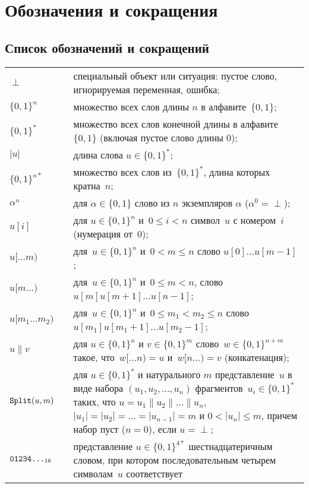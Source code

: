 \chapter{Обозначения и сокращения}\label{DEFS}

\section{Список обозначений и сокращений}

{\tabcolsep 0pt
\begin{longtable}{lrp{14.0cm}}
$\perp$  & \hspace{3mm} &
специальный объект или ситуация: 
пустое слово, игнорируемая переменная, ошибка;
\\[4pt]
%
$\{0,1\}^n$  &&
множество всех слов длины $n$ в алфавите~$\{0,1\}$;
\\[4pt]
%
$\{0,1\}^*$  &&
множество всех слов конечной длины в алфавите~$\{0,1\}$
(включая пустое слово длины $0$);
\\[4pt]
%
$|u|$      &&
длина слова $u\in\{0,1\}^*$;
\\[4pt]
%
$\{0,1\}^{n*}$  &&
множество всех слов из~$\{0,1\}^*$,
длина которых кратна~$n$;
\\[4pt]
%
$\alpha^n$  &&
для $\alpha\in\{0,1\}$ слово из $n$ экземпляров $\alpha$
($\alpha^0=\perp$);
\\[4pt]
%
$u[i]$ &&
для $u\in\{0,1\}^n$ и~$0\leq i<n$ символ~$u$ с номером~$i$
(нумерация от~$0$);
\\[4pt]
%
$u[\dots m)$ &&
для~$u\in\{0,1\}^n$ и~$0<m\leq n$ слово $u[0]\ldots u[m-1]$;
\\[4pt]
%
$u[m\dots)$  && 
для~$u\in\{0,1\}^n$ и~$0\leq m<n$, слово~$u[m]u[m+1]\ldots u[n-1]$;
\\[4pt]
%
$u[m_1\dots m_2)$  && 
для~$u\in\{0,1\}^n$ и~$0\leq m_1 <m_2\leq n$ слово
$u[m_1]u[m_1+1]\ldots u[m_2-1]$; 
\\[4pt]
%
$u\parallel v$  &&
для $u\in\{0,1\}^n$ и $v\in\{0,1\}^m$
слово~$w\in\{0,1\}^{n+m}$ такое, что~$w[\dots n)=u$ и~$w[n\dots)=v$
(конкатенация);
\\[4pt]
%
$\mathop{\texttt{Split}}\nolimits(u,m)$ &&
для $u\in\{0,1\}^*$ и натурального $m$ представление~$u$
в виде набора $(u_1,u_2,\ldots,u_n)$ фрагментов~$u_i\in\{0,1\}^*$ 
таких, что
$u=u_1\parallel u_2\parallel\ldots\parallel u_n$,
$|u_1|=|u_2|=\ldots=|u_{n-1}|=m$ и $0<|u_n|\leq m$, 
причем набор пуст ($n=0$), если $u=\perp$;
\\[4pt]
%
$\texttt{01234\ldots}_{16}$ && 
представление $u\in\{0,1\}^{4*}$ шестнадцатеричным словом,
при котором последовательным четырем символам~$u$ соответствует

\end{longtable}}
